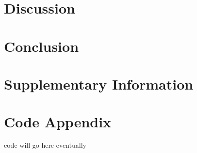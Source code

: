 \documentclass[11pt]{report}
\begin{document}
\section{Discussion}\label{discussion}

\section{Conclusion}\label{conclusion}

\clearpage

\appendix
\appendixpage
\addappheadtotoc

\section{Supplementary Information}\label{supplementary-information}

\section{Code Appendix}\label{code-appendix}

code will go here eventually

\small
\renewcommand{\bibsep}{0em}

\renewcommand{\bibname}{References}




\newpage


\end{document}
